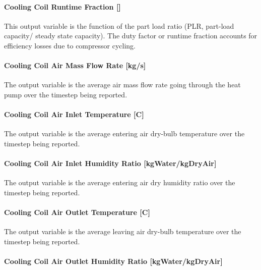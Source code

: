 \paragraph{Cooling Coil Runtime Fraction {[]}}\label{cooling-coil-runtime-fraction-7}

This output variable is the function of the part load ratio (PLR, part-load capacity/ steady state capacity). The duty factor or runtime fraction accounts for efficiency losses due to compressor cycling.

\paragraph{Cooling Coil Air Mass Flow Rate {[}kg/s{]}}\label{cooling-coil-air-mass-flow-rate-kgs-2}

The output variable is the average air mass flow rate going through the heat pump over the timestep being reported.

\paragraph{Cooling Coil Air Inlet Temperature {[}C{]}}\label{cooling-coil-air-inlet-temperature-c-2}

The output variable is the average entering air dry-bulb temperature over the timestep being reported.

\paragraph{Cooling Coil Air Inlet Humidity Ratio {[}kgWater/kgDryAir{]}}\label{cooling-coil-air-inlet-humidity-ratio-kgwaterkgdryair-2}

The output variable is the average entering air dry humidity ratio over the timestep being reported.

\paragraph{Cooling Coil Air Outlet Temperature {[}C{]}}\label{cooling-coil-air-outlet-temperature-c-2}

The output variable is the average leaving air dry-bulb temperature over the timestep being reported.

\paragraph{Cooling Coil Air Outlet Humidity Ratio {[}kgWater/kgDryAir{]}}\label{cooling-coil-air-outlet-humidity-ratio-kgwaterkgdryair-2}

